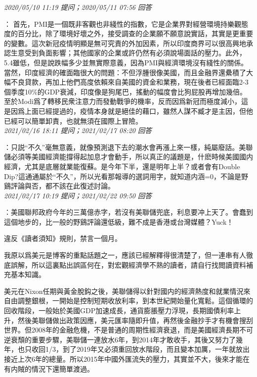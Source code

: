 \documentclass[twocolumn]{ctexart}
\begin{document}
\textit{\hfill\noindent\small 2020/05/10 11:19 提问；2020/05/11 07:56 回答}

：
首先，PMI是一個既非客觀也非綫性的指數，它是企業界對經營環境持樂觀態度的百分比，除了環境好壞之外，接受調查的企業願不願意說實話，其實是更重要的變數。這次新冠疫情明顯是無可究責的外加因素，所以印度商界可以很高興地承認生意受到負面影響；其他國家的企業或許仍然有必須說場面話的壓力。此外，5.4雖低，但是說跌幅多少並無實際意義，因為PMI與經濟環境沒有綫性的關係。 
當然，印度經濟的確面臨很大的問題：不但浮腫很像美國，而且金融界還纍積了大幅不良貸款，再加上他們高度依賴來自美國的資金和業務，現在後者已經面臨2-3個季度10\%的GDP衰減，印度像是狗尾巴，搖動的幅度會比狗屁股再增加幾倍。 
至於Modi爲了轉移民衆注意力而發動戰爭的機率，反而因爲新冠而極度減小，這是因爲上面已經提過的，疫情本身就是絕佳的藉口，雖然人謀不臧才是主因，但他已經可以簡單卸責，也就無須在國際上冒險。
\\

\textit{\hfill\noindent\small 2021/02/16 18:11 提问；2021/02/17 08:20 回答}

：只説“不久”毫無意義，就像預測退下去的潮水會再漲上來一樣，純屬廢話。美聯儲必須等美國經濟能撐得起加息才會動手，所以真正的議題是，什麽時候美國國内經濟，尤其是底層就業能復蘇。是今年下半，還是明年上半？或者會有Double Dip?這通通屬於“不久”，所以光看那報導的選詞用字，就知道内涵=0，不論是野鷄評論與否，都不該在此復述討論。
\\

\textit{\hfill\noindent\small 2021/02/17 10:19 提问；2021/02/22 09:50 回答}

：美國聯邦政府今年的三萬億赤字，若沒有美聯儲兜底，利息要冲上天了。會蠢到這個地步的，比一般的野鷄評論還低級，難不成是香港或台灣媒體？Yuck！

違反《讀者須知》規則，禁言一個月。


我原以爲美元是博客的重點話題之一，應該已經解釋得很清楚了，但一連串有人徹底誤解，所以這裏點出誤區何在，對宏觀經濟學不熟的讀者，請自行找閲讀資料補充基本知識。

美元在Nixon任期與黃金脫鈎之後，美聯儲得以針對國内的經濟熱度和就業情況來自由調整銀根，一開始是控制短期收放利率，到本世紀開始量化寬鬆。這個循環的回收階段，一般始於美國GDP加速成長，通貨膨脹壓力浮現，長期國債利率上升，然後美聯儲做出政策因應，美元匯率隨即升值，再然後金融抄手才有機會搜刮世界。但2008年的金融危機，不是普通的周期性經濟衰退，而是美國經濟長期不可逆衰頹的重要步驟，美聯儲一連放水6年，到2014年才敢收手，其後又努力了幾年，也只收回1/3，到了2019年又必須重回放水階段，而且變本加厲，一年就放出接近上次6年的總量。所以2015年中國外匯流失的壓力，其實並不大，後來才能在有内賊的情況下還簡單渡過。
\end{document}

